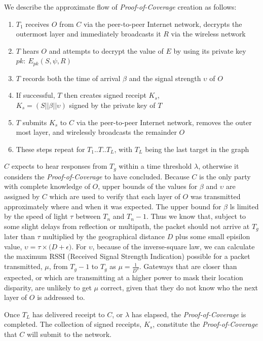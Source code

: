 \documentclass[10pt, nonatbib, nocopyrightspace, reprint]{sigplanconf}
\begin{document}
We describe the approximate flow of \emph{Proof-of-Coverage} creation as follows:

\begin{enumerate}
  \item $T_1$ receives $O$ from $C$ via the peer-to-peer Internet network, decrypts the outermost layer and immediately broadcasts it $R$ via the wireless network
  \item $T$ hears $O$ and attempts to decrypt the value of $E$ by using its private key $pk:\ E_{pk}\left(S, \psi, R\right)$
  \item $T$ records both the time of arrival $\beta$ and the signal strength $\upsilon$ of $O$
  \item If successful, $T$ then creates signed receipt $K_s$, \\${K_s = \left(S || \beta || \upsilon\right)}$ signed by the private key of $T$
  \item $T$ submits $K_s$ to $C$ via the peer-to-peer Internet network, removes the outer most layer, and wirelessly broadcasts the remainder $O$
  \item These steps repeat for $T_1$..$T$..$T_L$, with $T_L$ being the last target in the graph
\end{enumerate}

$C$ expects to hear responses from $T_g$ within a time threshold $\lambda$, otherwise it considers the \emph{Proof-of-Coverage} to have concluded. Because $C$ is the only party with complete knowledge of $O$, upper bounds of the values for $\beta$ and $\upsilon$ are assigned by $C$ which are used to verify that each layer of $O$ was transmitted approximately where and when it was expected. The upper bound for $\beta$ ls limited by the speed of light $\tau$ between $T_n$ and $T_n-1$. Thus we know that, subject to some slight delays from reflection or multipath, the packet should not arrive at $T_g$ later than $\tau$ multiplied by the geographical distance $D$ plus some small episilon value, $\upsilon = \tau \times \Big(D + \epsilon\Big)$. For $\upsilon$, because of the inverse-square law, we can calculate the maximum RSSI (Received Signal Strength Indication) possible for a packet transmitted, $\mu$, from $T_g-1$ to $T_g$ as $\mu = \frac{1}{D^2}$. Gateways that are closer than expected, or which are transmitting at a higher power to mask their location disparity, are unlikely to get $\mu$ correct, given that they do not know who the next layer of $O$ is addressed to.

Once $T_L$ has delivered receipt to $C$, or $\lambda$ has elapsed, the \emph{Proof-of-Coverage} is completed. The collection of signed receipts, $K_s$, constitute the \emph{Proof-of-Coverage} that $C$ will submit to the network.
\end{document}
